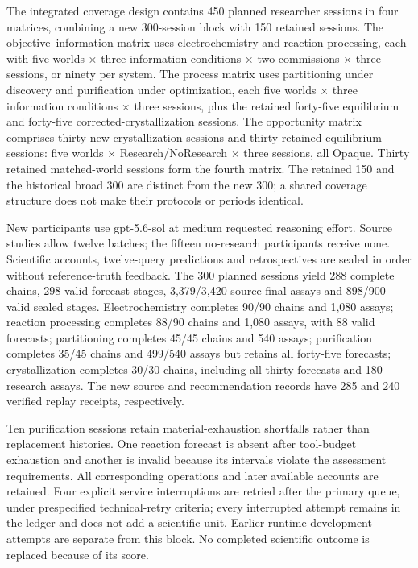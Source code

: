 \documentclass[12pt,a4paper]{article}
\begin{document}
The integrated coverage design contains 450 planned researcher sessions in four matrices, combining a new 300-session block with 150 retained sessions. The objective--information matrix uses electrochemistry and reaction processing, each with five worlds × three information conditions × two commissions × three sessions, or ninety per system. The process matrix uses partitioning under discovery and purification under optimization, each five worlds × three information conditions × three sessions, plus the retained forty-five equilibrium and forty-five corrected-crystallization sessions. The opportunity matrix comprises thirty new crystallization sessions and thirty retained equilibrium sessions: five worlds × Research/NoResearch × three sessions, all Opaque. Thirty retained matched-world sessions form the fourth matrix. The retained 150 and the historical broad 300 are distinct from the new 300; a shared coverage structure does not make their protocols or periods identical.

New participants use gpt-5.6-sol at medium requested reasoning effort. Source studies allow twelve batches; the fifteen no-research participants receive none. Scientific accounts, twelve-query predictions and retrospectives are sealed in order without reference-truth feedback. The 300 planned sessions yield 288 complete chains, 298 valid forecast stages, 3,379/3,420 source final assays and 898/900 valid sealed stages. Electrochemistry completes 90/90 chains and 1,080 assays; reaction processing completes 88/90 chains and 1,080 assays, with 88 valid forecasts; partitioning completes 45/45 chains and 540 assays; purification completes 35/45 chains and 499/540 assays but retains all forty-five forecasts; crystallization completes 30/30 chains, including all thirty forecasts and 180 research assays. The new source and recommendation records have 285 and 240 verified replay receipts, respectively.

Ten purification sessions retain material-exhaustion shortfalls rather than replacement histories. One reaction forecast is absent after tool-budget exhaustion and another is invalid because its intervals violate the assessment requirements. All corresponding operations and later available accounts are retained. Four explicit service interruptions are retried after the primary queue, under prespecified technical-retry criteria; every interrupted attempt remains in the ledger and does not add a scientific unit. Earlier runtime-development attempts are separate from this block. No completed scientific outcome is replaced because of its score.
\end{document}
